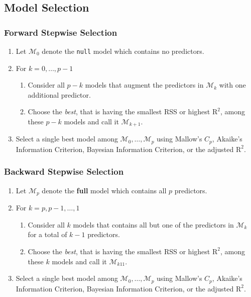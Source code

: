 \documentclass[11pt]{article}
\theoremstyle{definition}
\begin{document}
\subsection{Model Selection}
\subsubsection{Forward Stepwise Selection}
\begin{enumerate}
	\item Let $\mathcal{M}_0$ denote the \texttt{null} model which contains no predictors.
	\item For $k = 0,\dots,p-1$
	\begin{enumerate}
		\item Consider all $p - k$ models that augment the predictors in $\mathcal{M}_k$ with one additional predictor.
		\item Choose the \emph{best}, that is having the smallest RSS or highest $\text{R}^2$, among these $p-k$ models and call it $\mathcal{M}_{k+1}$.
	\end{enumerate}
	\item Select a single best model among $\mathcal{M}_0,\dots, \mathcal{M}_p$ using Mallow's $C_p$, Akaike's Information Criterion, Bayesian Information Criterion, or the adjusted $\text{R}^2$.
\end{enumerate}

\subsubsection{Backward Stepwise Selection}
\begin{enumerate}
	\item Let $\mathcal{M}_p$ denote the \textbf{full} model which contains all $p$ predictors.
	\item For $k = p, p-1, \dots, 1$
	\begin{enumerate}
		\item Consider all $k$ models that contains all but one of the predictors in $\mathcal{M}_k$ for a total of $k-1$ predictors.
		\item Choose the \emph{best}, that is having the smallest RSS or highest $\text{R}^2$, among these $k$ models and call it $\mathcal{M}_{k11}$.
	\end{enumerate}
	\item Select a single best model among $\mathcal{M}_0,\dots, \mathcal{M}_p$ using Mallow's $C_p$, Akaike's Information Criterion, Bayesian Information Criterion, or the adjusted $\text{R}^2$.
\end{enumerate}
\end{document}
